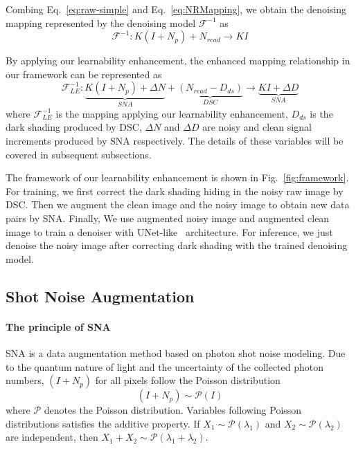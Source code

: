 \documentclass[sigconf,screen,nonacm]{acmart}
\begin{document}
Combing Eq.~\eqref{eq:raw-simple} and Eq.~\eqref{eq:NRMapping}, we obtain the denoising mapping represented by the denoising model $\mathcal F^{-1}$ as
\begin{equation}\label{eq:NRmapping_old}
    \mathcal F^{-1}:  K(I + N_p) + N_{read} \rightarrow KI
\end{equation}

By applying our learnability enhancement, the enhanced mapping relationship in our framework can be represented as
\begin{equation}\label{eq:ours}
\mathcal F_{LE}^{-1}: \underbrace{K (I + N_{p}) + \Delta N}_{SNA} + \underbrace{(N_{read} - D_{ds})}_{DSC} \rightarrow \underbrace{KI + \Delta D}_{SNA}
\end{equation}
where $\mathcal F_{LE}^{-1}$ is the mapping applying our learnability enhancement, $D_{ds}$ is the dark shading produced by DSC, $\Delta N$ and $\Delta D$ are noisy and clean signal increments produced by SNA respectively. The details of these variables will be covered in subsequent subsections.

The framework of our learnability enhancement is shown in Fig.~\ref{fig:framework}. For training, we first correct the dark shading hiding in the noisy raw image by DSC. Then we augment the clean image and the noisy image to obtain new data pairs by SNA. Finally, We use augmented noisy image and augmented clean image to train a denoiser with UNet-like~\cite{Unet} architecture. For inference, we just denoise the noisy image after correcting dark shading with the trained denoising model.









 \subsection{Shot Noise Augmentation}
  \label{SNA}
    \paragraph{\textbf{The principle of SNA}}
    SNA is a data augmentation method based on photon shot noise modeling.
    Due to the quantum nature of light and the uncertainty of the collected photon numbers, $(I + N_p)$ for all pixels follow the Poisson distribution
    \begin{equation}\label{eq:possion}
        (I + N_p) \sim{\mathcal P(I)}
    \end{equation}
    where $\mathcal P$ denotes the Poisson distribution.
    Variables following Poisson distributions satisfies the additive property. If ${X_{1}\sim \mathcal{P} (\lambda _{1})}$ and ${X_{2}\sim \mathcal{P} (\lambda _{2})}$ are independent, then ${X_{1} + X_{2}\sim \mathcal{P} (\lambda_{1} + \lambda_{2})}$.
\end{document}
